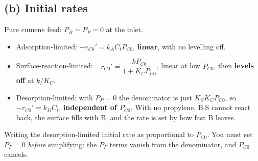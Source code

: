 \documentclass[11pt]{article}
\begin{document}
\subsection*{(b) Initial rates}
Pure cumene feed: $P_B=P_P=0$ at the inlet.
\begin{answer}
\begin{itemize}[itemsep=1pt]
\item Adsorption-limited: $-r_{C0}'=k_AC_tP_{C0}$, \textbf{linear}, with no levelling off.
\item Surface-reaction-limited: $-r_{C0}'=\dfrac{kP_{C0}}{1+K_CP_{C0}}$, linear at low $P_{C0}$, then \textbf{levels off} at $k/K_C$.
\item Desorption-limited: with $P_P=0$ the denominator is just $K_SK_CP_{C0}$, so $-r_{C0}'=k_DC_t$, \textbf{independent of $P_{C0}$}.
With no propylene, B$\cdot$S cannot react back, the surface fills with B, and the rate is set by how fast B leaves.
\end{itemize}
\end{answer}
\begin{center}
\end{center}
\begin{mistake}
Writing the desorption-limited initial rate as proportional to $P_{C0}$. You must set $P_P=0$ \emph{before} simplifying: the
$P_P$ terms vanish from the denominator, and $P_{C0}$ cancels.
\end{mistake}
\end{document}
